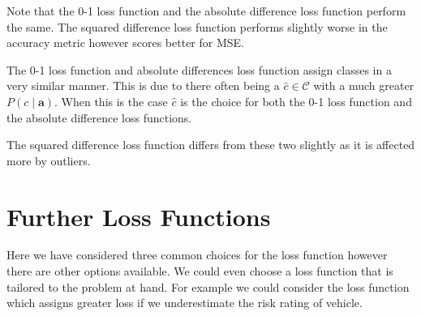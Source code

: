 
Note that the 0-1 loss function and the absolute difference loss function perform the same.
The squared difference loss function performs slightly worse in the accuracy metric however scores better for MSE.

The 0-1 loss function and absolute differences loss function assign classes in a very similar manner.
This is due to there often being a $\hat{c} \in \mathcal{C}$ with a much greater $P(c \mid \mathbf{a})$.
When this is the case $\hat{c}$ is the choice for both the 0-1 loss function and the absolute difference loss functions.

The squared difference loss function differs from these two slightly as it is affected more by outliers.

\section{Further Loss Functions}
Here we have considered three common choices for the loss function however there are other options available.
We could even choose a loss function that is tailored to the problem at hand.
For example we could consider the loss function which assigns greater loss if we underestimate the risk rating of vehicle.